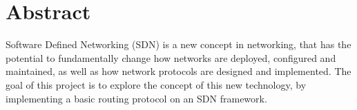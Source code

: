 \chapter{Abstract}

Software Defined Networking (SDN) is a new concept in networking, that has the potential to fundamentally change how networks are deployed, configured and maintained, as well as how network protocols are designed and implemented. The goal of this project is to explore the concept of this new technology, by implementing a basic routing protocol on an SDN framework.
